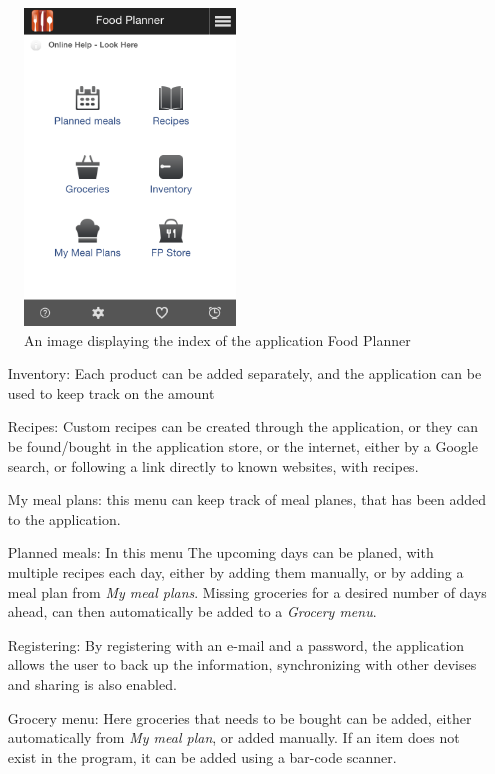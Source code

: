 \begin{figure}[H]
    \centering
    \includegraphics[width=0.5\textwidth]{Grafik/FoodPlanner/index}
    \caption{An image displaying the index of the application Food Planner}
    \label{FoodPlannerIndex}
\end{figure}
\begin{itemize}
  \item[Inventory:] Each product can be added separately, and the application can be used to keep track on the amount
  \item[Recipes:] Custom recipes can be created through the application, or they can be found/bought in the application store, or the internet, either by a Google search, or following a link directly to known websites, with recipes.
  \item[My meal plans:] this menu can keep track of meal planes, that has been added to the application.
  \item[Planned meals:] In this menu The upcoming days can be planed, with multiple recipes each day, either by adding them manually, or by adding a meal plan from \textit{My meal plans}. Missing groceries for a desired  number of days ahead, can then automatically be added to a \textit{Grocery menu}.
  \item[Registering:] By registering with an e-mail and a password, the application allows the user to back up the information, synchronizing with other devises and sharing is also enabled.
  \item[Grocery menu:] Here groceries that needs to be bought can be added, either automatically from \textit{My meal plan}, or added manually. If an item does not exist in the program, it can be added using a bar-code scanner.
\end{itemize}


